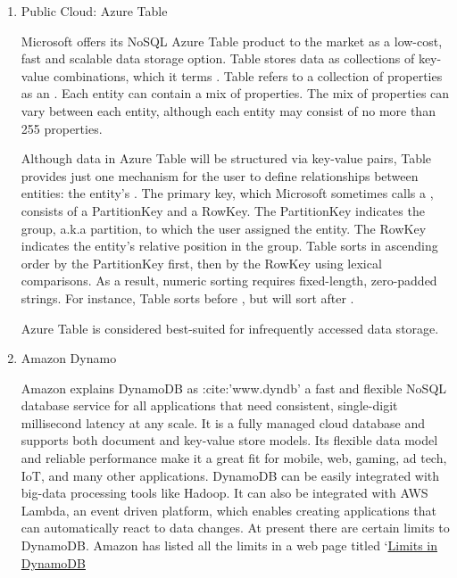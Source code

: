 \begin{enumerate}
\item {} 
Public Cloud: Azure Table

Microsoft offers its NoSQL Azure Table product to the market as a
low-cost, fast and scalable data storage
option. \label{\detokenize{i524/technologies:id469}}{\hyperref[\detokenize{i524/technologies:www-what-to-use}]{\sphinxcrossref{{[}402{]}}}} Table stores data as collections
of key-value combinations, which it terms .  Table
refers to a collection of properties as an .  Each entity
can contain a mix of properties.  The mix of properties can vary
between each entity, although each entity may consist of no more
than 255 properties. \label{\detokenize{i524/technologies:id470}}{\hyperref[\detokenize{i524/technologies:www-blobqueuetable}]{\sphinxcrossref{{[}403{]}}}}

Although data in Azure Table will be structured via key-value
pairs, Table provides just one mechanism for the user to define
relationships between entities: the entity's .  The
primary key, which Microsoft sometimes calls a ,
consists of a PartitionKey and a RowKey.  The PartitionKey
indicates the group, a.k.a partition, to which the user assigned
the entity.  The RowKey indicates the entity's relative position
in the group.  Table sorts in ascending order by the PartitionKey
first, then by the RowKey using lexical comparisons.  As a
result, numeric sorting requires fixed-length, zero-padded
strings.  For instance, Table sorts  before , but will
sort  after . \label{\detokenize{i524/technologies:id471}}{\hyperref[\detokenize{i524/technologies:www-scalable-partitioning}]{\sphinxcrossref{{[}404{]}}}}

Azure Table is considered best-suited for infrequently accessed
data storage.

\item {} 
Amazon Dynamo

Amazon explains DynamoDB as :cite:'www.dyndb' a fast and flexible
NoSQL database service for all applications that need consistent,
single-digit millisecond latency at any scale. It is a fully managed
cloud database and supports both document and key-value store models.
Its flexible data model and reliable performance make it a great fit
for mobile, web, gaming, ad tech, IoT, and many other applications.
DynamoDB can be easily integrated with big-data processing tools like
Hadoop. It can also be integrated with AWS Lambda, an event driven platform,
which enables creating applications that can automatically react to data
changes. At present there are certain limits to DynamoDB. Amazon has listed
all the limits in a web page titled ‘\href{http://docs.aws.amazon.com/amazondynamodb/latest/developerguide/Limits.html}{Limits in DynamoDB}

\end{enumerate}

